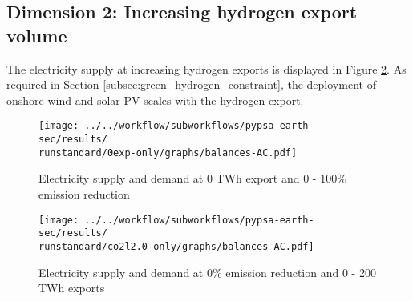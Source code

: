 
\subsection{Dimension 2: Increasing hydrogen export volume}
\label{subsec:increase_h2}

The electricity supply at increasing hydrogen exports is displayed in Figure \ref{fig:balances-ac-co2l20}. As required in Section \ref{subsec:green_hydrogen_constraint}, the deployment of onshore wind and solar PV scales with the hydrogen export.



\begin{figure}[h!]
    \centering
    \texttt{[image: ../../workflow/subworkflows/pypsa-earth-sec/results/\\runstandard/0exp-only/graphs/balances-AC.pdf]}
    \caption{Electricity supply and demand at 0 TWh export and 0 - 100\% emission reduction}
    \label{fig:balances-ac-0exp}
\end{figure}


\begin{figure}[h!]
    \centering
    \texttt{[image: ../../workflow/subworkflows/pypsa-earth-sec/results/\\runstandard/co2l2.0-only/graphs/balances-AC.pdf]}
    \caption{Electricity supply and demand at 0\% emission reduction and 0 - 200 TWh exports}
    \label{fig:balances-ac-co2l20}
\end{figure}


